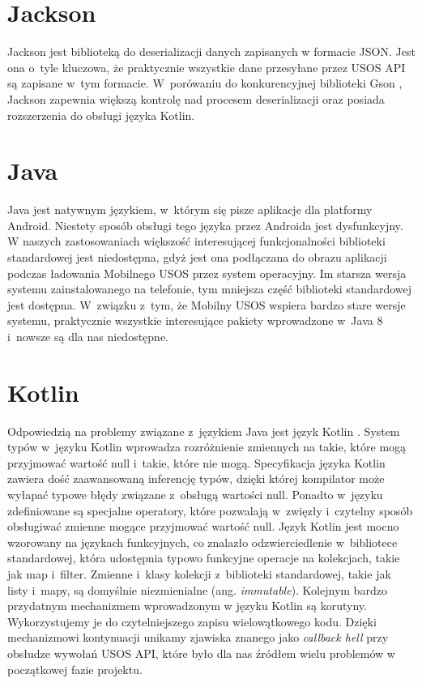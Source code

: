 \documentclass{pracamgr}
\begin{document}
\section{Jackson}

Jackson \cite{jackson} jest biblioteką do deserializacji danych zapisanych w
formacie JSON. Jest ona o~tyle kluczowa, że praktycznie wszystkie dane przesyłane
przez USOS API są zapisane w~tym formacie. W~porówaniu do konkurencyjnej biblioteki
Gson \cite{gson}, Jackson zapewnia większą kontrolę nad procesem deserializacji
oraz posiada rozszerzenia do obsługi języka Kotlin.

\section{Java}

Java \cite{java} jest natywnym językiem, w~którym się pisze aplikacje dla platformy
Android. Niestety sposób obsługi tego języka przez Androida jest dysfunkcyjny.
W naszych zastosowaniach większość interesującej funkcjonalności biblioteki
standardowej jest niedostępna, gdyż jest ona podłączana do obrazu aplikacji podczas
ładowania Mobilnego USOS przez system operacyjny. Im starsza wersja systemu
zainstalowanego na telefonie, tym mniejsza część biblioteki standardowej jest
dostępna. W~związku z~tym, że Mobilny USOS wspiera bardzo stare wersje systemu,
praktycznie wszystkie interesujące pakiety wprowadzone w~Java 8 i~nowsze są dla
nas niedostępne.

\section{Kotlin}

Odpowiedzią na problemy związane z~językiem Java jest język Kotlin \cite{kotlin}.
System typów w~języku Kotlin wprowadza rozróżnienie zmiennych na takie, które mogą
przyjmować wartość null i~takie, które nie mogą. Specyfikacja języka Kotlin zawiera
dość zaawansowaną inferencję typów, dzięki której kompilator może wyłapać typowe błędy
związane z~obsługą wartości null. Ponadto w~języku zdefiniowane są specjalne
operatory, które pozwalają w~zwięzły i~czytelny sposób obsługiwać zmienne mogące
przyjmować wartość null. Język Kotlin jest mocno wzorowany na językach funkcyjnych,
co znalazło odzwierciedlenie w~bibliotece standardowej, która udostępnia typowo
funkcyjne operacje na kolekcjach, takie jak map i~filter. Zmienne i~klasy
kolekcji z~biblioteki standardowej, takie jak listy i~mapy, są domyślnie niezmienialne
(ang. \textit{immutable}). Kolejnym bardzo przydatnym mechanizmem wprowadzonym w
języku Kotlin są korutyny. Wykorzystujemy je do czytelniejszego zapisu wielowątkowego
kodu. Dzięki mechanizmowi kontynuacji unikamy zjawiska znanego jako \textit{callback hell}
przy obsłudze wywołań USOS API, które było dla nas źródłem wielu problemów w
początkowej fazie projektu.
\end{document}
